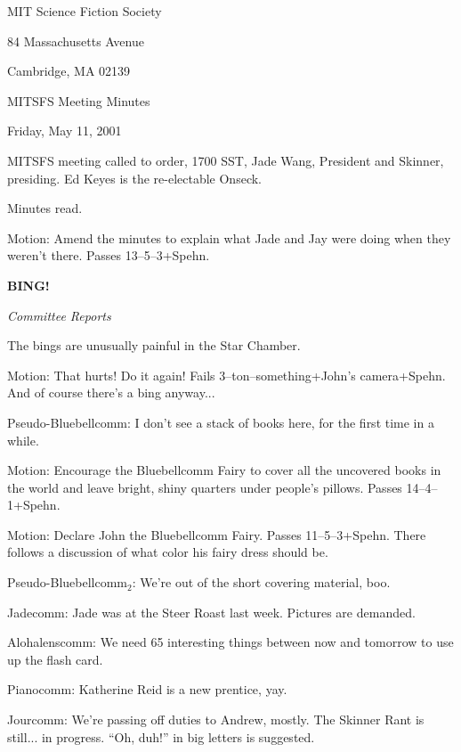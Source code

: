 \documentclass[12pt]{article}
\newcommand{\bing}{{\bf BING!} }
\newcommand{\goto}[1]{\bing \vskip 12pt \centerline{{\em{#1}}}}
\begin{document}
\begin{center}

MIT Science Fiction Society 

84 Massachusetts Avenue

Cambridge, MA 02139

\vspace{12pt}

MITSFS Meeting Minutes 

Friday, May 11, 2001

\end{center}
 
\vspace{18pt}

\setlength{\parskip}{6pt}

\noindent
MITSFS meeting called to order, 1700 SST, Jade Wang, President and
Skinner, presiding.  Ed Keyes is the re-electable Onseck.

Minutes read.

Motion: Amend the minutes to explain what Jade and Jay were doing
when they weren't there.  Passes 13--5--3+Spehn.

\goto{Committee Reports}

The bings are unusually painful in the Star Chamber.

Motion: That hurts!  Do it again!  Fails 3--ton--something+John's
camera+Spehn.  And of course there's a bing anyway...

Pseudo-Bluebellcomm: I don't see a stack of books here, for the
first time in a while.

Motion: Encourage the Bluebellcomm Fairy to cover all the uncovered
books in the world and leave bright, shiny quarters under people's
pillows.  Passes 14--4--1+Spehn.

Motion: Declare John the Bluebellcomm Fairy.  Passes 11--5--3+Spehn.
There follows a discussion of what color his fairy dress should be.

Pseudo-Bluebellcomm$_2$: We're out of the short covering material,
boo.

Jadecomm: Jade was at the Steer Roast last week.  Pictures are
demanded.

Alohalenscomm: We need 65 interesting things between now and tomorrow
to use up the flash card.

Pianocomm: Katherine Reid is a new prentice, yay.

Jourcomm: We're passing off duties to Andrew, mostly.  The Skinner
Rant is still... in progress.  ``Oh, duh!'' in big letters is
suggested.
\end{document}

